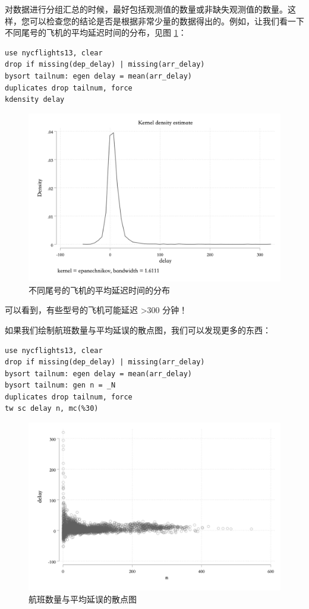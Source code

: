 对数据进行分组汇总的时候，最好包括观测值的数量或非缺失观测值的数量。这样，您可以检查您的结论是否是根据非常少量的数据得出的。例如，让我们看一下不同尾号的飞机的平均延迟时间的分布，见图 \ref{fig:kdensitydelay}：

\begin{lstlisting}
use nycflights13, clear
drop if missing(dep_delay) | missing(arr_delay)
bysort tailnum: egen delay = mean(arr_delay)
duplicates drop tailnum, force
kdensity delay
\end{lstlisting}

\begin{figure}[htbp]
  \centering
  \includegraphics[width=\textwidth]{assets/kdensitydelay.png}
  \caption{不同尾号的飞机的平均延迟时间的分布}
  \label{fig:kdensitydelay}
\end{figure}

可以看到，有些型号的飞机可能延迟 \textgreater{}300 分钟！

如果我们绘制航班数量与平均延误的散点图，我们可以发现更多的东西：

\begin{lstlisting}
use nycflights13, clear
drop if missing(dep_delay) | missing(arr_delay)
bysort tailnum: egen delay = mean(arr_delay)
bysort tailnum: gen n = _N
duplicates drop tailnum, force
tw sc delay n, mc(%30)
\end{lstlisting}

\begin{figure}[htbp]
  \centering
  \includegraphics[width=\textwidth]{assets/scdelayn.png}
  \caption{航班数量与平均延误的散点图}\label{fig:scdelayn}
\end{figure}

